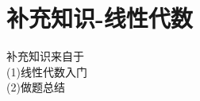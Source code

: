\documentclass[12pt, a4paper, oneside, UTF8]{ctexbook}
\begin{document}

\else
\fi
\chapter{补充知识-线性代数}
\begin{tcolorbox}
    补充知识来自于 \\
    (1)线性代数入门 \\
    (2)做题总结
\end{tcolorbox}
\ifx\allfiles\undefined
\end{document}
